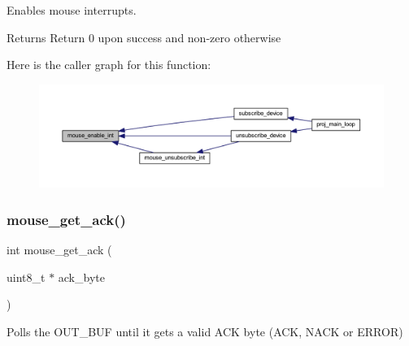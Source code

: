 Enables mouse interrupts. 

\begin{DoxyReturn}{Returns}
Return 0 upon success and non-\/zero otherwise 
\end{DoxyReturn}
Here is the caller graph for this function\+:\nopagebreak
\begin{figure}[H]
\begin{center}
\leavevmode
\includegraphics[width=350pt]{group__mouse_gaf19e0109275a1162be7188deb9c02b41_icgraph}
\end{center}
\end{figure}
\mbox{\label{group__mouse_ga49c9125041daa483d30f55a8c28b41fc}} 
\subsubsection{\texorpdfstring{mouse\+\_\+get\+\_\+ack()}{mouse\_get\_ack()}}
{\footnotesize\ttfamily int mouse\+\_\+get\+\_\+ack (\begin{DoxyParamCaption}\item[{uint8\+\_\+t $\ast$}]{ack\+\_\+byte }\end{DoxyParamCaption})}



Polls the O\+U\+T\+\_\+\+B\+UF until it gets a valid A\+CK byte (A\+CK, N\+A\+CK or E\+R\+R\+OR) 


